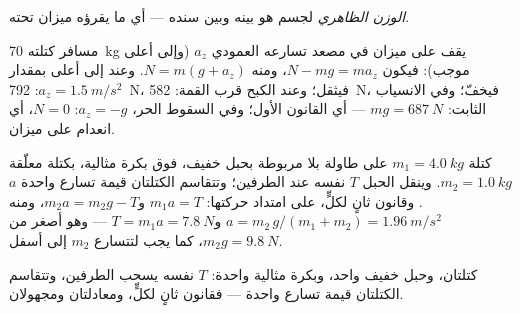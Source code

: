 \begin{definition}\label{def:g12:newtons-laws:apparent}
\emph{الوزن الظاهري} لجسم هو 
بينه وبين سنده --- أي ما يقرؤه ميزان تحته.
\end{definition}

\begin{example}[المصعد]\label{ex:g12:newtons-laws:elevator}
مسافر كتلته \qty{70}{kg} يقف على ميزان في مصعد تسارعه العمودي
$a_z$ (وإلى أعلى موجب): فيكون $N - mg = ma_z$، ومنه $N = m(g + a_z)$. وعند  إلى أعلى
بمقدار $a_z = \qty{1.5}{m/s^2}$: \qty{792}{N}، فيثقل؛ وعند الكبح قرب القمة: \qty{582}{N}،
فيخفّ؛ وفي الانسياب الثابت: $mg = \qty{687}{N}$ --- أي القانون الأول؛ وفي السقوط الحر، $a_z = -g$:
$N = 0$، أي انعدام  على ميزان.
\end{example}

\begin{example}\label{ex:g12:newtons-laws:pulley}
كتلة $m_1 = \qty{4.0}{kg}$ على طاولة بلا  مربوطة بحبل خفيف، فوق
بكرة مثالية، بكتلة معلّقة $m_2 = \qty{1.0}{kg}$. وينقل الحبل 
$T$ نفسه عند الطرفين؛ وتتقاسم الكتلتان قيمة تسارع واحدة $a$.
وقانون ثانٍ لكلٍّ، على امتداد حركتها: $m_1 a = T$ و$m_2 a = m_2 g - T$، ومنه
$a = m_2\,g/(m_1 + m_2) = \qty{1.96}{m/s^2}$ و$T = m_1 a = \qty{7.8}{N}$ ---
وهو أصغر من $m_2 g = \qty{9.8}{N}$، كما يجب لتتسارع $m_2$ إلى أسفل.
\end{example}

\begin{omfigure}

{\small كتلتان، وحبل خفيف واحد، وبكرة مثالية واحدة:  $T$ نفسه يسحب
الطرفين، وتتقاسم الكتلتان قيمة تسارع واحدة --- فقانون ثانٍ لكلٍّ، ومعادلتان
ومجهولان.}
\end{omfigure}

